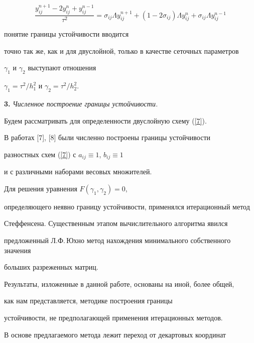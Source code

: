 \begin{equation}


\label{8}


\frac{y_{ij}^{n+1}-2y_{ij}^{n}+y_{ij}^{n-1}}{\tau^{2}}=


\sigma_{ij}\Lambda y_{ij}^{n+1} +


(1-2\sigma_{ij})\Lambda y_{ij}^{n}+


\sigma_{ij}\Lambda y_{ij}^{n-1}


\end{equation}


понятие границы устойчивости вводится


точно так же, как и для двуслойной, только в качестве сеточных параметров


$\gamma_{1}$ и $\gamma_{2}$ выступают отношения


$\gamma_{1}=\tau^{2} /h_{1}^{2}$ и $\gamma_{2}=\tau^{2} /h_{2}^{2}$.


\medskip





{\bf 3.} {\it Численное построение границы устойчивости.}


Будем рассматривать для определенности двуслойную схему (\ref{7}).


В работах [7], [8] были численно построены границы устойчивости 


разностных схем (\ref{7}) с $a_{ij} \equiv 1$, $b_{ij} \equiv 1$ 


и с различными наборами весовых множителей.


Для решения уравнения $F(\gamma_1, \gamma_2) = 0$,


определяющего неявно границу устойчивости, применялся итерационный метод


Стеффенсена. Существенным этапом вычислительного алгоритма явился


предложенный Л.Ф.\,Юхно метод нахождения минимального собственного значения


больших разреженных матриц.





Результаты, изложенные в данной работе, основаны на иной, более общей, 


как нам представляется, методике построения границы


устойчивости, не предполагающей применения итерационных методов.


В основе предлагаемого метода лежит переход от декартовых координат


